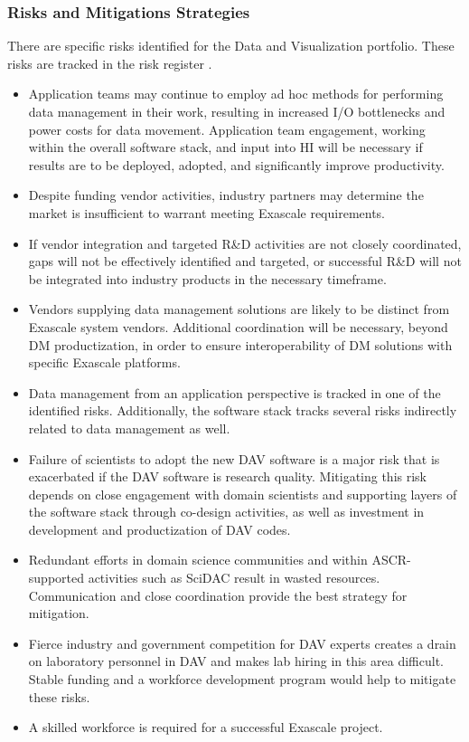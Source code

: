 \subsubsection{Risks and Mitigations Strategies}
There are specific risks identified for the Data and Visualization portfolio.  These risks are tracked in the risk register .  
\begin{itemize}
\item Application teams may continue to employ ad hoc methods for performing data management in their work, resulting in increased I/O bottlenecks and power costs for data movement. Application team engagement, working within the overall software stack, and input into HI will be necessary if results are to be deployed, adopted, and significantly improve productivity.
\item Despite funding vendor activities, industry partners may determine the market is insufficient to warrant meeting Exascale requirements.
\item If vendor integration and targeted R\&D activities are not closely coordinated, gaps will not be effectively identified and targeted, or successful R\&D will not be integrated into industry products in the necessary timeframe.
\item Vendors supplying data management solutions are likely to be distinct from Exascale system vendors. Additional coordination will be necessary, beyond DM productization, in order to ensure interoperability of DM solutions with specific Exascale platforms.
\item Data management from an application perspective is tracked in one of the identified risks.  Additionally, the software stack tracks several risks indirectly related to data management as well.
\item Failure of scientists to adopt the new DAV software is a major risk that is exacerbated if the DAV software is research quality. Mitigating this risk depends on close engagement with domain scientists and supporting layers of the software stack through co-design activities, as well as investment in development and productization of DAV codes.
\item Redundant efforts in domain science communities and within ASCR-supported activities such as SciDAC result in wasted resources. Communication and close coordination provide the best strategy for mitigation.
\item Fierce industry and government competition for DAV experts creates a drain on laboratory personnel in DAV and makes lab hiring in this area difficult. Stable funding and a workforce development program would help to mitigate these risks.
\item A skilled workforce is required for a successful Exascale project.
\end{itemize}


